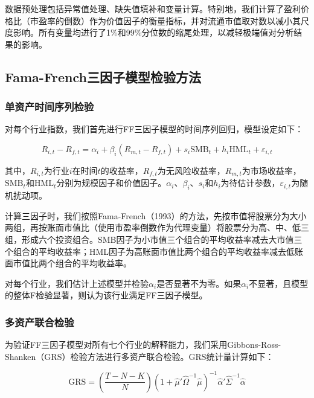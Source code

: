 \documentclass[12pt, a4paper]{article}
\begin{document}
数据预处理包括异常值处理、缺失值填补和变量计算。特别地，我们计算了盈利价格比（市盈率的倒数）作为价值因子的衡量指标，并对流通市值取对数以减小其尺度影响。所有变量均进行了1\%和99\%分位数的缩尾处理，以减轻极端值对分析结果的影响。

\subsection{Fama-French三因子模型检验方法}

\subsubsection{单资产时间序列检验}

对每个行业指数，我们首先进行FF三因子模型的时间序列回归，模型设定如下：

\begin{equation}
R_{i,t} - R_{f,t} = \alpha_i + \beta_i(R_{m,t} - R_{f,t}) + s_i\text{SMB}_t + h_i\text{HML}_t + \varepsilon_{i,t}
\end{equation}

其中，$R_{i,t}$为行业$i$在时间$t$的收益率，$R_{f,t}$为无风险收益率，$R_{m,t}$为市场收益率，$\text{SMB}_t$和$\text{HML}_t$分别为规模因子和价值因子。$\alpha_i$、$\beta_i$、$s_i$和$h_i$为待估计参数，$\varepsilon_{i,t}$为随机扰动项。

计算三因子时，我们按照Fama-French（1993）的方法，先按市值将股票分为大小两组，再按账面市值比（使用市盈率倒数作为代理变量）将股票分为高、中、低三组，形成六个投资组合。SMB因子为小市值三个组合的平均收益率减去大市值三个组合的平均收益率；HML因子为高账面市值比两个组合的平均收益率减去低账面市值比两个组合的平均收益率。

对每个行业，我们估计上述模型并检验$\alpha_i$是否显著不为零。如果$\alpha_i$不显著，且模型的整体F检验显著，则认为该行业满足FF三因子模型。

\subsubsection{多资产联合检验}

为验证FF三因子模型对所有七个行业的解释能力，我们采用Gibbons-Ross-Shanken（GRS）检验方法进行多资产联合检验。GRS统计量计算如下：

\begin{equation}
\text{GRS} = \left(\frac{T-N-K}{N}\right) \left(1 + \hat{\mu}' \hat{\Omega}^{-1} \hat{\mu}\right)^{-1} \hat{\alpha}' \hat{\Sigma}^{-1} \hat{\alpha}
\end{equation}
\end{document}
